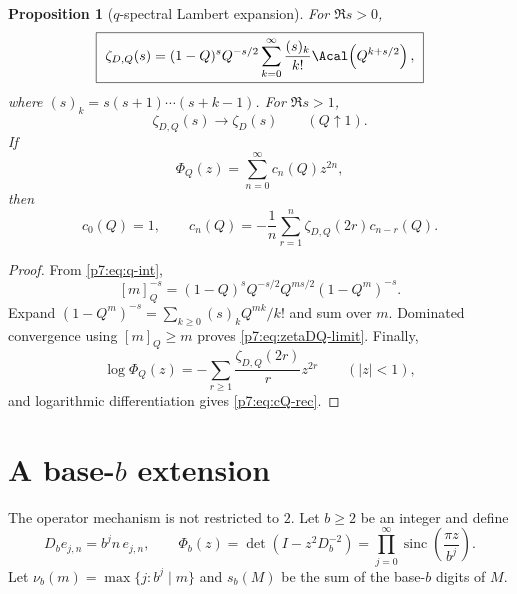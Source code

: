 \documentclass[11pt]{article}
\numberwithin{equation}{section}
\newtheorem{proposition}[theorem]{Proposition}
\theoremstyle{definition}
\theoremstyle{remark}
\newcommand{\sinc}{\operatorname{sinc}}
\begin{document}
\begin{proposition}[$q$-spectral Lambert expansion]\label{p7:prop:zetaDQ}
For $\Re s>0$,
\begin{equation}\label{p7:eq:zetaDQ-Lambert}
 \boxed{\ \zeta_{D,Q}(s)
 =(1-Q)^sQ^{-s/2}
 \sum_{k=0}^{\infty}\frac{(s)_k}{k!}
 \Acal\!\left(Q^{k+s/2}\right),\ }
\end{equation}
where $(s)_k=s(s+1)\cdots(s+k-1)$.  For $\Re s>1$,
\begin{equation}\label{p7:eq:zetaDQ-limit}
 \zeta_{D,Q}(s)\longrightarrow\zeta_D(s)
 \qquad(Q\uparrow1).
\end{equation}
If
\[
 \Phi_Q(z)=\sum_{n=0}^{\infty}c_n(Q)z^{2n},
\]
then
\begin{equation}\label{p7:eq:cQ-rec}
 c_0(Q)=1,
 \qquad
 c_n(Q)=-\frac1n\sum_{r=1}^{n}
 \zeta_{D,Q}(2r)c_{n-r}(Q).
\end{equation}
\end{proposition}

\begin{proof}
From \cref{p7:eq:q-int},
\[
 [m]_Q^{-s}=(1-Q)^sQ^{-s/2}
 Q^{ms/2}(1-Q^m)^{-s}.
\]
Expand $(1-Q^m)^{-s}=\sum_{k\ge0}(s)_kQ^{mk}/k!$ and sum over $m$.  Dominated convergence using $[m]_Q\ge m$ proves \cref{p7:eq:zetaDQ-limit}.  Finally,
\[
 \log\Phi_Q(z)=-\sum_{r\ge1}\frac{\zeta_{D,Q}(2r)}r z^{2r}
 \qquad(|z|<1),
\]
and logarithmic differentiation gives \cref{p7:eq:cQ-rec}.
\end{proof}

\section{A base-$b$ extension}

The operator mechanism is not restricted to $2$.  Let $b\ge2$ be an integer and define
\begin{equation}\label{p7:eq:Db}
 D_b e_{j,n}=b^jn\,e_{j,n},
 \qquad
 \Phi_b(z)=\det(I-z^2D_b^{-2})
 =\prod_{j=0}^{\infty}\sinc\!\left(\frac{\pi z}{b^j}\right).
\end{equation}
Let $\nu_b(m)=\max\{j:b^j\mid m\}$ and $s_b(M)$ be the sum of the base-$b$ digits of $M$.
\end{document}
